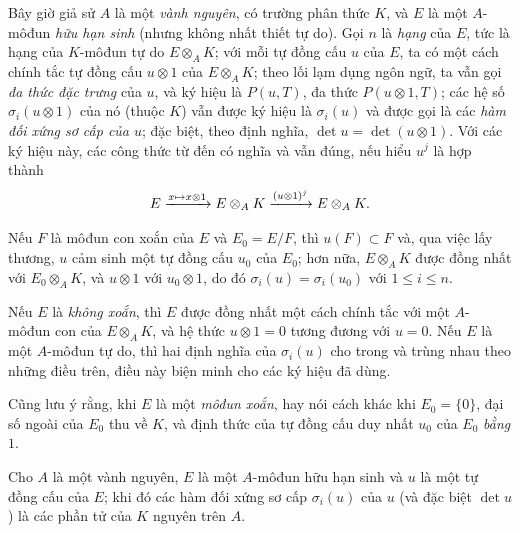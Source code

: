 \documentclass[oneside,10pt]{amsart}
\makeatletter
\renewcommand{\leq}{\leqslant}
\newcommand{\ega@arrow}[2]{\mathchoice{#1}{#2}{#2}{#2}}
\let\ega@shortmapsto\mapsto
\renewcommand{\mapsto}{\ega@arrow{\longmapsto}{\ega@shortmapsto}}
\let\EGAOriginalLabel\label
\renewcommand{\label}[1]{\phantomsection\EGAOriginalLabel{#1}}
\makeatother
\begin{document}
\begin{env}[6.4.2]
\label{II.6.4.2}
Bây giờ giả sử $A$ là một \emph{vành nguyên}, có trường phân thức $K$, và $E$ là một $A$-môđun \emph{hữu hạn sinh} (nhưng không nhất thiết tự do).
Gọi $n$ là \emph{hạng} của $E$, tức là hạng của $K$-môđun tự do $E\otimes_A K$;
với mỗi tự đồng cấu $u$ của $E$, ta có một cách chính tắc tự đồng cấu $u\otimes1$ của $E\otimes_A K$;
theo lối lạm dụng ngôn ngữ, ta vẫn gọi \emph{đa thức đặc trưng} của $u$, và ký hiệu là $P(u,T)$, đa thức $P(u\otimes1,T)$; các hệ số $\sigma_i(u\otimes1)$ của nó (thuộc $K$) vẫn được ký hiệu là $\sigma_i(u)$ và được gọi là các \emph{hàm đối xứng sơ cấp của $u$};
đặc biệt, theo định nghĩa, $\det u=\det(u\otimes1)$.
Với các ký hiệu này, các công thức từ  đến  có nghĩa và vẫn đúng, nếu hiểu $u^j$ là hợp thành
\[
  E\xrightarrow{x\mapsto x\otimes1}E\otimes_A K
   \xrightarrow{(u\otimes1)^j}E\otimes_A K.
\]

Nếu $F$ là môđun con xoắn của $E$ và $E_0=E/F$, thì $u(F)\subset F$ và, qua việc lấy thương, $u$ cảm sinh một tự đồng cấu $u_0$ của $E_0$;
hơn nữa, $E\otimes_A K$ được đồng nhất với $E_0\otimes_A K$, và $u\otimes1$ với $u_0\otimes1$, do đó $\sigma_i(u)=\sigma_i(u_0)$ với $1\leq i\leq n$.

Nếu $E$ là \emph{không xoắn}, thì $E$ được đồng nhất một cách chính tắc với một $A$-môđun con của $E\otimes_A K$, và hệ thức $u\otimes1=0$ tương đương với $u=0$.
Nếu $E$ là một $A$-môđun tự do, thì hai định nghĩa của $\sigma_i(u)$ cho trong  và  trùng nhau theo những điều trên, điều này biện minh cho các ký hiệu đã dùng.

Cũng lưu ý rằng, khi $E$ là một \emph{môđun xoắn}, hay nói cách khác khi $E_0=\{0\}$, đại số ngoài của $E_0$ thu về $K$, và định thức của tự đồng cấu duy nhất $u_0$ của $E_0$ \emph{bằng $1$}.
\end{env}

\begin{proposition}[6.4.3]
\label{II.6.4.3}
Cho $A$ là một vành nguyên, $E$ là một $A$-môđun hữu hạn sinh và $u$ là một tự đồng cấu của $E$;
khi đó các hàm đối xứng sơ cấp $\sigma_i(u)$ của $u$ (và đặc biệt $\det u$) là các phần tử của $K$ nguyên trên $A$.
\end{proposition}
\end{document}
